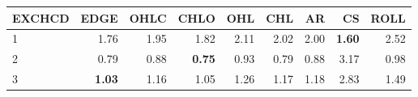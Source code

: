 \begin{table}[ht]
\centering
\begin{tabular}{lrrrrrrrr}
  \hline
EXCHCD & EDGE & OHLC & CHLO & OHL & CHL & AR & CS & ROLL \\ 
  \hline
1 & 1.76 & 1.95 & 1.82 & 2.11 & 2.02 & 2.00 & \textbf{1.60} & 2.52 \\ 
  2 & 0.79 & 0.88 & \textbf{0.75} & 0.93 & 0.79 & 0.88 & 3.17 & 0.98 \\ 
  3 & \textbf{1.03} & 1.16 & 1.05 & 1.26 & 1.17 & 1.18 & 2.83 & 1.49 \\ 
   \hline
\end{tabular}
\end{table}
